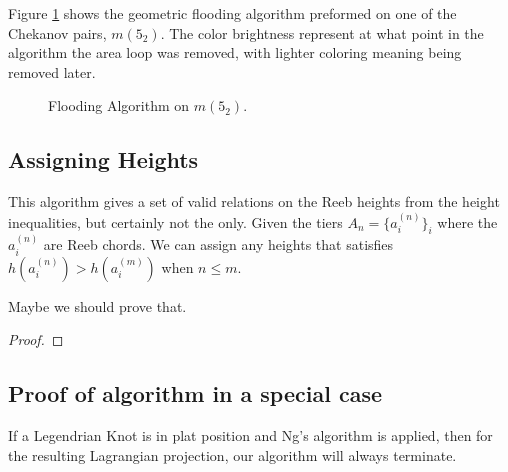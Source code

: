 \documentclass[11pt,oneside]{amsart}
\begin{document}
Figure \ref{fig:Flood} shows the geometric flooding algorithm preformed on one of the Chekanov pairs, $m(5_2)$. The color brightness represent at what point in the algorithm the area loop was removed, with lighter coloring meaning being removed later.


\begin{figure}[htbp]
  \label{fig:Flood}
  \centering
  
  \caption{Flooding Algorithm on $m(5_2)$.}
\end{figure}




\subsection{Assigning Heights}

This algorithm gives a set of valid relations on the Reeb heights from the height inequalities, but certainly not the only. Given the tiers $A_n=\{a^{(n)}_i\}_i$ where the $a^{(n)}_i$ are Reeb chords. We can assign any heights that satisfies $h(a^{(n)}_i)>h(a^{(m)}_i)$ when $n\leq m$.
\begin{theorem}
    Maybe we should prove that.
\end{theorem}
\begin{proof}
    
\end{proof}



\subsection{Proof of algorithm in a special case}


\begin{theorem}
    If a Legendrian Knot is in plat position and Ng's algorithm is applied, then for the resulting Lagrangian projection, our algorithm will always terminate.
\end{theorem}
\end{document}
